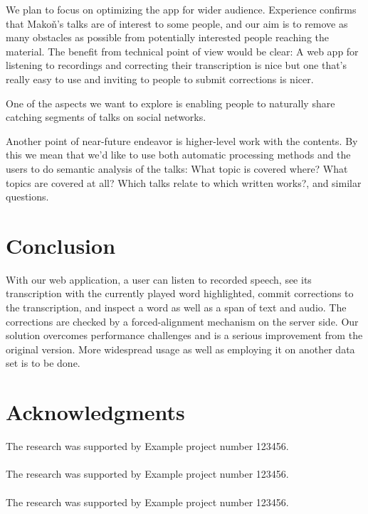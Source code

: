 \documentclass{svproc}
\begin{document}
We plan to focus on optimizing the app for wider audience. Experience confirms
that Mako\v{n}'s talks are of interest to some people, and our aim is to
remove as many obstacles as possible from potentially interested people reaching
the material. The benefit from technical point of view would be clear: A web app
for listening to recordings and correcting their transcription is nice but one
that's really easy to use and inviting to people to submit corrections is nicer.

One of the aspects we want to explore is enabling people to naturally share
catching segments of talks on social networks.

Another point of near-future endeavor is higher-level work with the contents. By
this we mean that we'd like to use both automatic processing methods and the
users to do semantic analysis of the talks: What topic is covered where? What
topics are covered at all? Which talks relate to which written works?, and
similar questions.

\section{Conclusion}

With our web application, a user can listen to recorded speech, see its
transcription with the currently played word highlighted, commit corrections to
the transcription, and inspect a word as well as a span of text and audio. The
corrections are checked by a forced-alignment mechanism on the server side. Our
solution overcomes performance challenges and is a serious improvement from the
original version. More widespread usage as well as employing it on another data
set is to be done.

\section*{Acknowledgments}

The research was supported by Example project number 123456.\\
\\
The research was supported by Example project number 123456.\\
\\
The research was supported by Example project number 123456.



\end{document}
